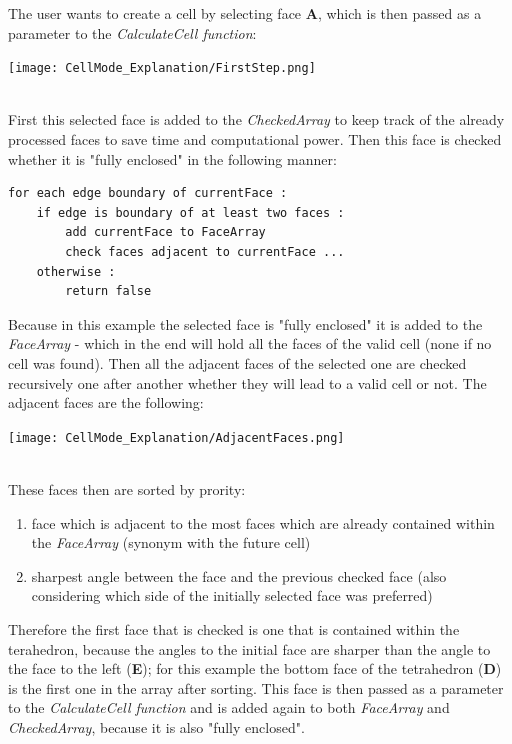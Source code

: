 \documentclass{report}
\begin{document}
		\noindent The user wants to create a cell by selecting face \textbf{A}, which is then passed as a parameter to the \textit{CalculateCell function}: \\
		\begin{center}
			\texttt{[image: CellMode\_Explanation/FirstStep.png]}
			\label{pic:pic5.2}
		\end{center}
		\hfill \\
		First this selected face is added to the \textit{CheckedArray} to keep track of the already processed faces to save time and computational power. Then this face is checked whether it is "fully enclosed" in the following manner:
		\begin{verbatim}
for each edge boundary of currentFace :
	if edge is boundary of at least two faces :
		add currentFace to FaceArray
		check faces adjacent to currentFace ...
	otherwise :
		return false
		\end{verbatim}
		Because in this example the selected face is "fully enclosed" it is added to the \textit{FaceArray} - which in the end will hold all the faces of the valid cell (none if no cell was found). Then all the adjacent faces of the selected one are checked recursively one after another whether they will lead to a valid cell or not. The adjacent faces are the following: \\
		\begin{center}
			\texttt{[image: CellMode\_Explanation/AdjacentFaces.png]}
			\label{pic:pic5.3}
		\end{center}
		\hfill \\
		These faces then are sorted by prority:
		\begin{enumerate}
			\item face which is adjacent to the most faces which are already contained within the \textit{FaceArray} (synonym with the future cell)
			\item sharpest angle between the face and the previous checked face (also considering which side of the initially selected face was preferred)
		\end{enumerate}
		Therefore the first face that is checked is one that is contained within the terahedron, because the angles to the initial face are sharper than the angle to the face to the left (\textbf{E}); for this example the bottom face of the tetrahedron (\textbf{D}) is the first one in the array after sorting. This face is then passed as a parameter to the \textit{CalculateCell function} and is added again to both \textit{FaceArray} and \textit{CheckedArray}, because it is also "fully enclosed". \\
\end{document}
